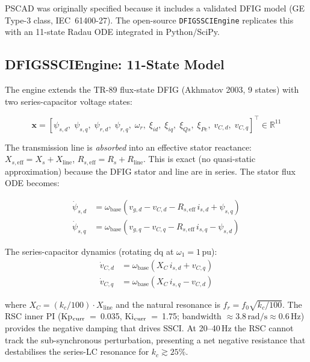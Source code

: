 \documentclass[11pt, a4paper]{article}
\begin{document}
\noindent PSCAD was originally specified because it includes a validated DFIG
model (GE Type-3 class, IEC~61400-27).  The open-source \texttt{DFIGSSCIEngine}
replicates this with an 11-state Radau ODE integrated in Python/SciPy.

\subsection{DFIGSSCIEngine: 11-State Model}

The engine extends the TR-89 flux-state DFIG (Akhmatov 2003, 9 states) with
two series-capacitor voltage states:

\begin{equation}
  \mathbf{x} = [\psi_{s,d},\;\psi_{s,q},\;\psi_{r,d},\;\psi_{r,q},\;\omega_r,\;
                \xi_{id},\;\xi_{iq},\;\xi_{Qs},\;\xi_{Pe},\;v_{C,d},\;v_{C,q}]^\top
                \in \mathbb{R}^{11}
  \label{eq:dfig_states}
\end{equation}

The transmission line is \emph{absorbed} into an effective stator reactance:
$X_{s,\mathrm{eff}} = X_s + X_{\mathrm{line}}$,\;
$R_{s,\mathrm{eff}} = R_s + R_{\mathrm{line}}$.
This is exact (no quasi-static approximation) because the DFIG stator and
line are in series.  The stator flux ODE becomes:

\begin{align}
  \dot{\psi}_{s,d} &= \omega_{\mathrm{base}}(v_{g,d} - v_{C,d} - R_{s,\mathrm{eff}}\,i_{s,d} + \psi_{s,q}) \label{eq:psi_sd}\\
  \dot{\psi}_{s,q} &= \omega_{\mathrm{base}}(v_{g,q} - v_{C,q} - R_{s,\mathrm{eff}}\,i_{s,q} - \psi_{s,d}) \label{eq:psi_sq}
\end{align}

The series-capacitor dynamics (rotating dq at $\omega_1 = 1\,\text{pu}$):
\begin{align}
  \dot{v}_{C,d} &= \omega_{\mathrm{base}}(X_C\,i_{s,d} + v_{C,q}) \label{eq:vCd}\\
  \dot{v}_{C,q} &= \omega_{\mathrm{base}}(X_C\,i_{s,q} - v_{C,d}) \label{eq:vCq}
\end{align}

where $X_C = (k_c/100)\cdot X_{\mathrm{line}}$ and the natural resonance is
$f_r = f_0\sqrt{k_c/100}$.  The RSC inner PI (Kp$_{\rm curr}$~=~0.035,
Ki$_{\rm curr}$~=~1.75; bandwidth $\approx 3.8\,\text{rad/s} \approx 0.6\,\text{Hz}$)
provides the negative damping that drives SSCI.  At 20--40\,Hz the RSC
cannot track the sub-synchronous perturbation, presenting a net negative
resistance that destabilises the series-LC resonance for $k_c \gtrsim 25\%$.
\end{document}
